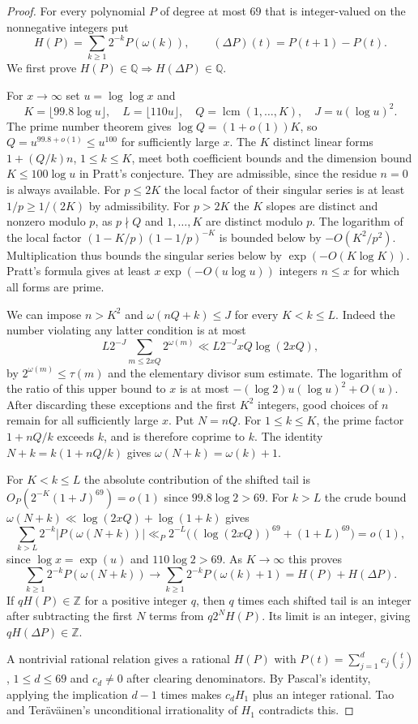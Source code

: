 \documentclass[11pt,letterpaper]{article}
\begin{document}
\begin{proof}
For every polynomial $P$ of degree at most $69$ that is integer-valued
on the nonnegative integers put
\[
 H(P)=\sum_{k\ge1}2^{-k}P(\omega(k)),\qquad
 (\Delta P)(t)=P(t+1)-P(t).
\]
We first prove $H(P)\in\mathbb Q\Longrightarrow H(\Delta P)\in\mathbb Q$.

For $x\to\infty$ set $u=\log\log x$ and
\[
 K=\lfloor 99.8\log u\rfloor,\quad L=\lfloor 110u\rfloor,
 \quad Q=\operatorname{lcm}(1,\ldots,K),\quad J=u(\log u)^2.
\]
The prime number theorem gives $\log Q=(1+o(1))K$, so
$Q=u^{99.8+o(1)}\le u^{100}$ for sufficiently large $x$.
The $K$ distinct linear forms $1+(Q/k)n$, $1\le k\le K$, meet both
coefficient bounds and the dimension bound $K\le100\log u$ in
Pratt's conjecture. They are admissible, since the residue $n=0$ is
always available. For $p\le2K$ the local factor of their singular
series is at least $1/p\ge1/(2K)$ by admissibility. For $p>2K$ the
$K$ slopes are distinct and nonzero modulo $p$, as $p\nmid Q$ and
$1,\ldots,K$ are distinct modulo $p$. The logarithm of the local factor
$(1-K/p)(1-1/p)^{-K}$ is bounded below by $-O(K^2/p^2)$.
Multiplication thus bounds the singular series below by
$\exp(-O(K\log K))$. Pratt's formula gives at least
$x\exp(-O(u\log u))$ integers $n\le x$ for which all forms are prime.

We can impose $n>K^2$ and $\omega(nQ+k)\le J$ for every $K<k\le L$.
Indeed the number violating any latter condition is at most
\[
 L2^{-J}\sum_{m\le 2xQ}2^{\omega(m)}
 \ll L2^{-J}xQ\log(2xQ),
\]
by $2^{\omega(m)}\le\tau(m)$ and the elementary divisor sum estimate.
The logarithm of the ratio of this upper bound to $x$ is at most $-(\log2)u(\log u)^2+O(u)$.
After discarding these exceptions and the first $K^2$ integers, good
choices of $n$ remain for all sufficiently large $x$. Put $N=nQ$. For $1\le k\le K$,
the prime factor $1+nQ/k$ exceeds $k$, and is therefore coprime to $k$.
The identity $N+k=k(1+nQ/k)$ gives $\omega(N+k)=\omega(k)+1$.

For $K<k\le L$ the absolute contribution of the shifted tail is
$O_P(2^{-K}(1+J)^{69})=o(1)$ since
$99.8\log2>69$. For $k>L$ the crude bound
$\omega(N+k)\ll\log(2xQ)+\log(1+k)$ gives
\[
 \sum_{k>L}2^{-k}|P(\omega(N+k))|
 \ll_P 2^{-L}\big((\log(2xQ))^{69}+(1+L)^{69}\big)=o(1),
\]
since $\log x=\exp(u)$ and $110\log2>69$. As $K\to\infty$ this proves
\[
 \sum_{k\ge1}2^{-k}P(\omega(N+k))
 \longrightarrow\sum_{k\ge1}2^{-k}P(\omega(k)+1)
 =H(P)+H(\Delta P).
\]
If $qH(P)\in\mathbb Z$ for a positive integer $q$, then $q$ times
each shifted tail is an integer after subtracting the first $N$ terms
from $q2^NH(P)$. Its limit is an integer, giving $qH(\Delta P)\in\mathbb Z$.

A nontrivial rational relation gives a rational $H(P)$ with
$P(t)=\sum_{j=1}^d c_j\binom{t}{j}$, $1\le d\le69$ and $c_d\ne0$
after clearing denominators. By Pascal's identity, applying the implication
$d-1$ times makes $c_dH_1$ plus an integer rational.
Tao and Ter\"av\"ainen's unconditional irrationality of $H_1$
\cite[Theorem~1.3]{tt} contradicts this.
\end{proof}
\end{document}

